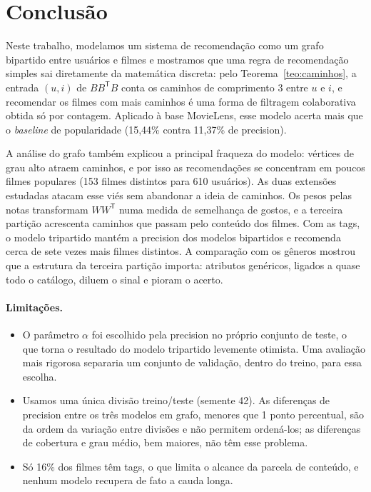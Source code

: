 \documentclass[12pt,a4paper]{article}
\theoremstyle{definition}
\begin{document}
\section{Conclusão}\label{sec:conclusao}

Neste trabalho, modelamos um sistema de recomendação como um grafo
bipartido entre usuários e filmes e mostramos que uma regra de
recomendação simples sai diretamente da matemática discreta: pelo
Teorema~\ref{teo:caminhos}, a entrada $(u, i)$ de $BB^{\mathsf T}B$ conta
os caminhos de comprimento 3 entre $u$ e $i$, e recomendar os filmes com
mais caminhos é uma forma de filtragem colaborativa obtida só por
contagem. Aplicado à base MovieLens, esse modelo acerta mais que o
\emph{baseline} de popularidade (15{,}44\% contra 11{,}37\% de precision).

A análise do grafo também explicou a principal fraqueza do modelo:
vértices de grau alto atraem caminhos, e por isso as recomendações se
concentram em poucos filmes populares (153 filmes distintos para 610
usuários). As duas extensões estudadas atacam esse viés sem abandonar a
ideia de caminhos. Os pesos pelas notas transformam $WW^{\mathsf T}$ numa
medida de semelhança de gostos, e a terceira partição acrescenta caminhos
que passam pelo conteúdo dos filmes. Com as tags, o modelo tripartido
mantém a precision dos modelos bipartidos e recomenda cerca de sete
vezes mais filmes distintos. A comparação com os gêneros mostrou que a
estrutura da terceira partição importa: atributos genéricos, ligados a
quase todo o catálogo, diluem o sinal e pioram o acerto.

\paragraph{Limitações.}
\begin{itemize}
  \item O parâmetro $\alpha$ foi escolhido pela precision no próprio
        conjunto de teste, o que torna o resultado do modelo tripartido
        levemente otimista. Uma avaliação mais rigorosa separaria um
        conjunto de validação, dentro do treino, para essa escolha.
  \item Usamos uma única divisão treino/teste (semente 42). As
        diferenças de precision entre os três modelos em grafo, menores
        que 1 ponto percentual, são da ordem da variação entre divisões
        e não permitem ordená-los; as diferenças de cobertura e grau
        médio, bem maiores, não têm esse problema.
  \item Só 16\% dos filmes têm tags, o que limita o alcance da parcela
        de conteúdo, e nenhum modelo recupera de fato a cauda longa.
\end{itemize}
\end{document}
